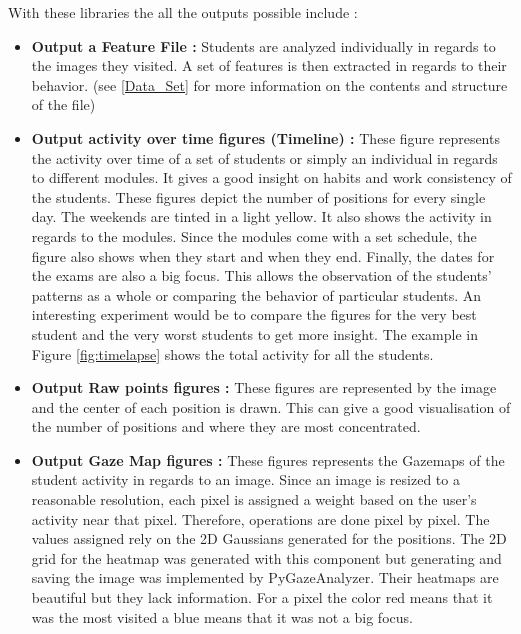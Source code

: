 \documentclass[a4paper,11pt]{report}
\numberwithin{figure}{section} %
\begin{document}
    With these libraries the all the outputs possible include :

    \begin{itemize}
        \item[\textbullet] \textbf{Output a Feature File :} Students are analyzed individually in regards to the images they visited.
        A set of features is then extracted in regards to their behavior.
        (see \ref{Data_Set} for more information on the contents and structure of the file)
        \item[\textbullet] \textbf{Output activity over time figures (Timeline) :} These figure represents the activity over time of a set of students or simply an individual in regards to different modules.
        It gives a good insight on habits and work consistency of the students.
        These figures depict the number of positions for every single day.
        The weekends are tinted in a light yellow.
        It also shows the activity in regards to the modules.
        Since the modules come with a set schedule, the figure also shows when they start and when they end.
        Finally, the dates for the exams are also a big focus.
        This allows the observation of the students' patterns as a whole or comparing the behavior of particular students.
        An interesting experiment would be to compare the figures for the very best student and the very worst students to get more insight.
        The example in Figure \ref{fig:timelapse} shows the total activity for all the students.
        \item[\textbullet] \textbf{Output Raw points figures :} These figures are represented by the image and the center of each position is drawn.
        This can give a good visualisation of the number of positions and where they are most concentrated.
        \item[\textbullet] \textbf{Output Gaze Map figures :} These figures represents the Gazemaps of the student activity in regards to an image.
        Since an image is resized to a reasonable resolution, each pixel is assigned a weight based on the user's activity near that pixel.
        Therefore, operations are done pixel by pixel.
        The values assigned rely on the 2D Gaussians generated for the positions.
        The 2D grid for the heatmap was generated with this component but generating and saving the image was implemented by PyGazeAnalyzer.
        Their heatmaps are beautiful but they lack information. For a pixel the color red means that it was the most visited a blue means that it was not a big focus.

\end{itemize}
\end{document}
